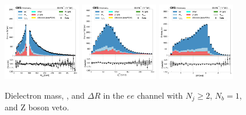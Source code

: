\begin{figure}[htb!]
    \centering
    \includegraphics[width=0.3\textwidth]{chapters/Appendix/sectionPlots/figures/data_mc_overlays/ee_2016_cat_gt2_eq1_b_signal_linear_lepton_dilepton1_mass}
    \includegraphics[width=0.3\textwidth]{chapters/Appendix/sectionPlots/figures/data_mc_overlays/ee_2016_cat_gt2_eq1_b_signal_linear_lepton_dilepton1_pt}
    \includegraphics[width=0.3\textwidth]{chapters/Appendix/sectionPlots/figures/data_mc_overlays/ee_2016_cat_gt2_eq1_b_signal_linear_lepton_dilepton1_delta_r}
    \caption{Dielectron mass, \pt, and $\Delta R$ in the $ee$ channel
    with $N_{j} \geq 2$, $N_{b} = 1$, and Z boson veto.}
    \label{fig:ee_1_dilepton}
\end{figure}

